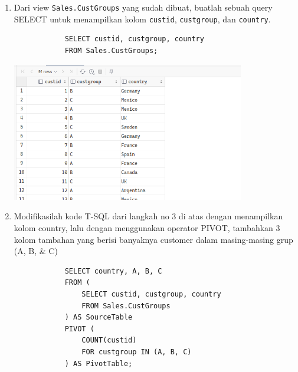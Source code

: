 \documentclass[12pt,titlepage]{article}
\begin{document}
\begin{enumerate}
    \item {
        Dari view \texttt{Sales.CustGroups} yang sudah dibuat, buatlah sebuah query SELECT untuk
        menampilkan kolom \texttt{custid}, \texttt{custgroup}, dan \texttt{country}.

        \begin{verbatim}
            SELECT custid, custgroup, country
            FROM Sales.CustGroups;
        \end{verbatim}

        \begin{center}
            \includegraphics[width=0.8\textwidth]{./images/1.png}
        \end{center}
    }
    \item {
        Modifikasilah kode T-SQL dari langkah no 3 di atas dengan menampilkan kolom country,
        lalu dengan menggunakan operator PIVOT, tambahkan 3 kolom tambahan yang berisi banyaknya
        customer dalam masing-masing grup (A, B, \& C)

        \begin{verbatim}
            SELECT country, A, B, C
            FROM (
                SELECT custid, custgroup, country
                FROM Sales.CustGroups
            ) AS SourceTable
            PIVOT (
                COUNT(custid)
                FOR custgroup IN (A, B, C)
            ) AS PivotTable;
        \end{verbatim}

}
\end{enumerate}
\end{document}
